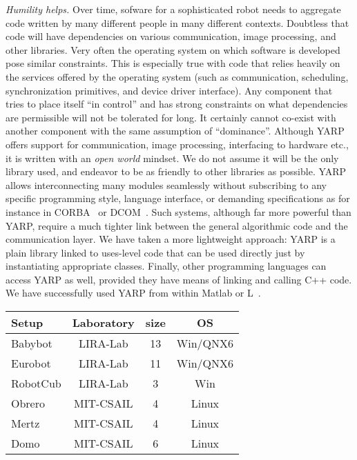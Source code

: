 \emph {Humility helps.}
Over time, sofware for a sophisticated robot needs to 
aggregate code written by many different people in many
different contexts.  Doubtless that code will have
dependencies on various communication, image processing,
and other libraries. Very often the operating system on which
software is developed pose similar constraints. This is especially
true with code that relies heavily on the services offered by the 
operating system (such as communication, scheduling, synchronization primitives, 
and device driver interface).
%
Any component that tries to place itself ``in control'' and has strong
constraints on what dependencies are permissible will not be tolerated
for long.  It certainly cannot co-exist with another component
with the same assumption of ``dominance''. 
Although YARP offers support for communication, image processing,
interfacing to hardware etc., it is written with an {\em open world}
mindset.  We do not assume it will be the only library used, and
endeavor to be as friendly to other libraries as possible.
%
YARP allows interconnecting many modules seamlessly without subscribing
to any specific programming style, language interface, 
or demanding specifications as for instance in CORBA~\cite{vinoski97corba}
or DCOM~\cite{dcom}. Such systems, although far more powerful than YARP,
require a much tighter link between the general algorithmic code and the 
communication layer.
We have taken a more lightweight approach: YARP is a plain library linked
to uses-level code that can be used directly just by instantiating appropriate classes.
%
%
%
%
%
%
%
%
Finally, other programming languages can access YARP as well, provided they
have means of linking and calling C++ code. We have successfully used
YARP from within Matlab or L~\cite{brooks90behavior}.


{\small
\begin{tabular}{|l|c|c|c|}
\hline
Setup&Laboratory&size&OS\\
\hline
Babybot&LIRA-Lab&13&Win/QNX6\\
Eurobot&LIRA-Lab&11&Win/QNX6\\
RobotCub&LIRA-Lab&3&Win\\
Obrero&MIT-CSAIL&4&Linux\\
Mertz&MIT-CSAIL&4&Linux\\
Domo&MIT-CSAIL&6&Linux\\
\hline
\end{tabular}
}

